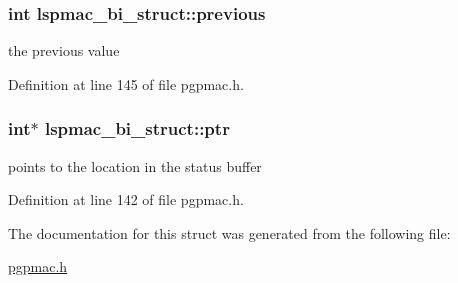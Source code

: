 \hypertarget{structlspmac__bi__struct_a00f09cb3d7bdbe1058fb56bb8c2b0fa3}{
\subsubsection[{previous}]{\setlength{\rightskip}{0pt plus 5cm}int lspmac\-\_\-bi\-\_\-struct\-::previous}}\label{structlspmac__bi__struct_a00f09cb3d7bdbe1058fb56bb8c2b0fa3}


the previous value 



Definition at line 145 of file pgpmac.\-h.

\hypertarget{structlspmac__bi__struct_ae201bf05130bcb6985704ea42efabeb3}{
\subsubsection[{ptr}]{\setlength{\rightskip}{0pt plus 5cm}int$\ast$ lspmac\-\_\-bi\-\_\-struct\-::ptr}}\label{structlspmac__bi__struct_ae201bf05130bcb6985704ea42efabeb3}


points to the location in the status buffer 



Definition at line 142 of file pgpmac.\-h.



The documentation for this struct was generated from the following file\-:\begin{DoxyCompactItemize}
\item 
\hyperlink{pgpmac_8h}{pgpmac.\-h}\end{DoxyCompactItemize}
